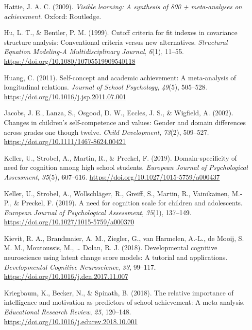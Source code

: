 \documentclass[
  man]{apa6}
\newlength{\cslhangindent}
\newlength{\cslentryspacingunit} %
\newenvironment{CSLReferences}[2] %
 {%
  \setlength{\parindent}{0pt}
  \ifodd #1
  \let\oldpar\par
  \def\par{\hangindent=\cslhangindent\oldpar}
  \fi
  \setlength{\parskip}{#2\cslentryspacingunit}
 }%
 {}
\begin{document}
\begin{CSLReferences}{1}{0}
\leavevmode{}%
Hattie, J. A. C. (2009). \emph{Visible learning: A synthesis of 800 + meta-analyses on achievement}. Oxford: Routledge.

\leavevmode{}%
Hu, L. T., \& Bentler, P. M. (1999). Cutoff criteria for fit indexes in covariance structure analysis: Conventional criteria versus new alternatives. \emph{Structural Equation Modeling-A Multidisciplinary Journal}, \emph{6}(1), 11--55. \url{https://doi.org/10.1080/10705519909540118}

\leavevmode{}%
Huang, C. (2011). Self-concept and academic achievement: A meta-analysis of longitudinal relations. \emph{Journal of School Psychology}, \emph{49}(5), 505--528. \url{https://doi.org/10.1016/j.jsp.2011.07.001}

\leavevmode{}%
Jacobs, J. E., Lanza, S., Osgood, D. W., Eccles, J. S., \& Wigfield, A. (2002). Changes in children's self-competence and values: Gender and domain differences across grades one though twelve. \emph{Child Development}, \emph{73}(2), 509--527. \url{https://doi.org/10.1111/1467-8624.00421}

\leavevmode{}%
Keller, U., Strobel, A., Martin, R., \& Preckel, F. (2019). Domain-specificity of need for cognition among high school students. \emph{European Journal of Psychological Assessment}, \emph{35}(5), 607--616. \url{https://doi.org/10.1027/1015-5759/a000437}

\leavevmode{}%
Keller, U., Strobel, A., Wollschläger, R., Greiff, S., Martin, R., Vainikainen, M.-P., \& Preckel, F. (2019). A need for cognition scale for children and adolescents. \emph{European Journal of Psychological Assessment}, \emph{35}(1), 137--149. \url{https://doi.org/10.1027/1015-5759/a000370}

\leavevmode{}%
Kievit, R. A., Brandmaier, A. M., Ziegler, G., van Harmelen, A.-L., de Mooij, S. M. M., Moutoussis, M., \ldots{} Dolan, R. J. (2018). Developmental cognitive neuroscience using latent change score models: A tutorial and applications. \emph{Developmental Cognitive Neuroscience}, \emph{33}, 99--117. \url{https://doi.org/10.1016/j.dcn.2017.11.007}

\leavevmode{}%
Kriegbaum, K., Becker, N., \& Spinath, B. (2018). The relative importance of intelligence and motivation as predictors of school achievement: A meta-analysis. \emph{Educational Research Review}, \emph{25}, 120--148. \url{https://doi.org/10.1016/j.edurev.2018.10.001}


\end{CSLReferences}
\end{document}
